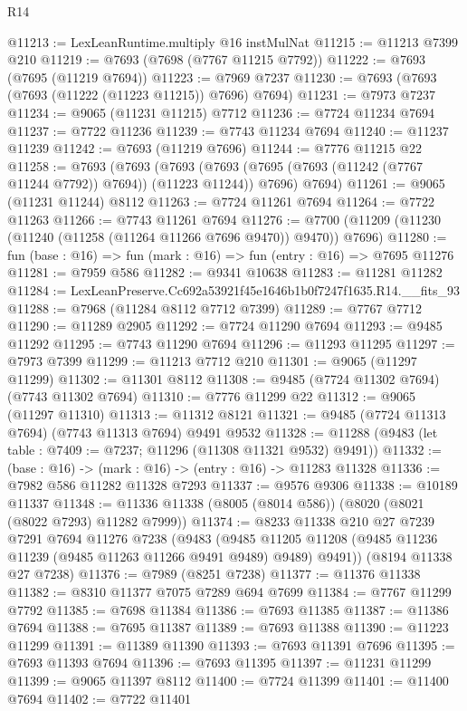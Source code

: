 \begin{lexlean}{R14}
\begin{coremodule}
@11213 := LexLeanRuntime.multiply @16 instMulNat
@11215 := @11213 @7399 @210
@11219 := @7693 (@7698 (@7767 @11215 @7792))
@11222 := @7693 (@7695 (@11219 @7694))
@11223 := @7969 @7237
@11230 := @7693 (@7693 (@7693 (@11222 (@11223 @11215)) @7696) @7694)
@11231 := @7973 @7237
@11234 := @9065 (@11231 @11215) @7712
@11236 := @7724 @11234 @7694
@11237 := @7722 @11236
@11239 := @7743 @11234 @7694
@11240 := @11237 @11239
@11242 := @7693 (@11219 @7696)
@11244 := @7776 @11215 @22
@11258 := @7693
    (@7693
      (@7693 (@7693 (@7695 (@7693 (@11242 (@7767 @11244 @7792)) @7694)) (@11223 @11244)) @7696)
      @7694)
@11261 := @9065 (@11231 @11244) @8112
@11263 := @7724 @11261 @7694
@11264 := @7722 @11263
@11266 := @7743 @11261 @7694
@11276 := @7700 (@11209 (@11230 (@11240 (@11258 (@11264 @11266 @7696 @9470)) @9470)) @7696)
@11280 := fun (base : @16) => fun (mark : @16) => fun (entry : @16) => @7695 @11276
@11281 := @7959 @586
@11282 := @9341 @10638
@11283 := @11281 @11282
@11284 := LexLeanPreserve.Cc692a53921f45e1646b1b0f7247f1635.R14.__fits_93
@11288 := @7968 (@11284 @8112 @7712 @7399)
@11289 := @7767 @7712
@11290 := @11289 @2905
@11292 := @7724 @11290 @7694
@11293 := @9485 @11292
@11295 := @7743 @11290 @7694
@11296 := @11293 @11295
@11297 := @7973 @7399
@11299 := @11213 @7712 @210
@11301 := @9065 (@11297 @11299)
@11302 := @11301 @8112
@11308 := @9485 (@7724 @11302 @7694) (@7743 @11302 @7694)
@11310 := @7776 @11299 @22
@11312 := @9065 (@11297 @11310)
@11313 := @11312 @8121
@11321 := @9485 (@7724 @11313 @7694) (@7743 @11313 @7694) @9491 @9532
@11328 := @11288 (@9483 (let table : @7409 := @7237; @11296 (@11308 @11321 @9532) @9491))
@11332 := (base : @16) -> (mark : @16) -> (entry : @16) -> @11283 @11328
@11336 := @7982 @586 @11282 @11328 @7293
@11337 := @9576 @9306
@11338 := @10189 @11337
@11348 := @11336 @11338 (@8005 (@8014 @586)) (@8020 (@8021 (@8022 @7293) @11282 @7999))
@11374 := @8233
    @11338
    @210
    @27
    @7239
    @7291
    @7694
    @11276
    @7238
    (@9483
      (@9485 @11205 @11208 (@9485 @11236 @11239 (@9485 @11263 @11266 @9491 @9489) @9489) @9491))
    (@8194 @11338 @27 @7238)
@11376 := @7989 (@8251 @7238)
@11377 := @11376 @11338
@11382 := @8310 @11377 @7075 @7289 @694 @7699
@11384 := @7767 @11299 @7792
@11385 := @7698 @11384
@11386 := @7693 @11385
@11387 := @11386 @7694
@11388 := @7695 @11387
@11389 := @7693 @11388
@11390 := @11223 @11299
@11391 := @11389 @11390
@11393 := @7693 @11391 @7696
@11395 := @7693 @11393 @7694
@11396 := @7693 @11395
@11397 := @11231 @11299
@11399 := @9065 @11397 @8112
@11400 := @7724 @11399
@11401 := @11400 @7694
@11402 := @7722 @11401

\end{coremodule}
\end{lexlean}
